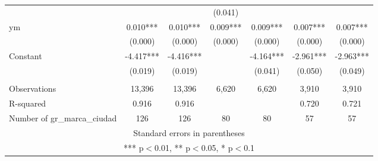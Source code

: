 \begin{longtable}{lcccccc}
 &  &  & (0.041) &  &  &  \\
ym & 0.010*** & 0.010*** & 0.009*** & 0.009*** & 0.007*** & 0.007*** \\
& (0.000) & (0.000) & (0.000) & (0.000) & (0.000) & (0.000) \\
Constant & -4.417*** & -4.416*** &  & -4.164*** & -2.961*** & -2.963*** \\
 & (0.019) & (0.019) &  & (0.041) & (0.050) & (0.049) \\
 &  &  &  &  &  &  \\
Observations & 13,396 & 13,396 & 6,620 & 6,620 & 3,910 & 3,910 \\
R-squared & 0.916 & 0.916 &  &  & 0.720 & 0.721 \\
 Number of gr\_marca\_ciudad & 126 & 126 & 80 & 80 & 57 & 57 \\ \hline
\multicolumn{7}{c}{ Standard errors in parentheses} \\
\multicolumn{7}{c}{ *** p$<$0.01, ** p$<$0.05, * p$<$0.1} \\
\end{longtable}
